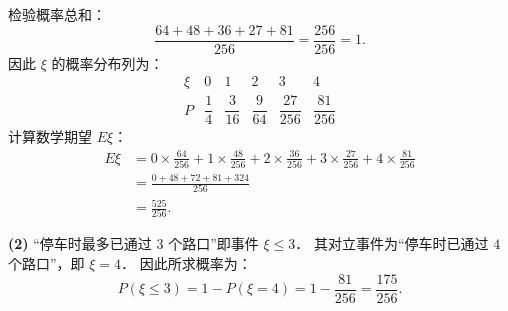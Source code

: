 \begin{answer}
检验概率总和：
\nopagebreak[4]
\[
\frac{64 + 48 + 36 + 27 + 81}{256} = \frac{256}{256} = 1.
\]
因此 $\xi$ 的概率分布列为：
\nopagebreak[4]
\[
\begin{array}{c|ccccc}
\xi & 0 & 1 & 2 & 3 & 4 \\
\hline
P & \dfrac{1}{4} & \dfrac{3}{16} & \dfrac{9}{64} & \dfrac{27}{256} & \dfrac{81}{256}
\end{array}
\]
计算数学期望 $E\xi$：
\nopagebreak[4]
\[
\begin{aligned}
E\xi &= 0 \times \frac{64}{256} + 1 \times \frac{48}{256} + 2 \times \frac{36}{256} + 3 \times \frac{27}{256} + 4 \times \frac{81}{256} \\
&= \frac{0 + 48 + 72 + 81 + 324}{256} \\
&= \frac{525}{256}.
\end{aligned}
\]

\textbf{(2)}
“停车时最多已通过 $3$ 个路口”即事件 $\xi \leqslant 3$．
其对立事件为“停车时已通过 $4$ 个路口”，即 $\xi = 4$．
因此所求概率为：
\nopagebreak[4]
\[
P(\xi \leqslant 3) = 1 - P(\xi = 4) = 1 - \frac{81}{256} = \frac{175}{256}.
\]



\end{answer}
